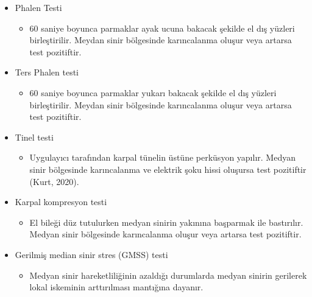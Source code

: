 \documentclass[12pt,twoside]{deuthesis}
\providecommand{\tightlist}{%
  \setlength{\itemsep}{0pt}\setlength{\parskip}{0pt}}
\begin{document}
\begin{itemize}
\item
  Phalen Testi
  \begin{itemize}
  \tightlist
  \item
    60 saniye boyunca parmaklar ayak ucuna bakacak şekilde el dış yüzleri birleştirilir. Meydan sinir bölgesinde karıncalanma oluşur veya artarsa test pozitiftir.
  \end{itemize}
\item
  Ters Phalen testi
  \begin{itemize}
  \tightlist
  \item
    60 saniye boyunca parmaklar yukarı bakacak şekilde el dış yüzleri birleştirilir. Meydan sinir bölgesinde karıncalanma oluşur veya artarsa test pozitiftir.
  \end{itemize}
\item
  Tinel testi
  \begin{itemize}
  \tightlist
  \item
    Uygulayıcı tarafından karpal tünelin üstüne perküsyon yapılır. Medyan sinir bölgesinde karıncalanma ve elektrik şoku hissi oluşursa test pozitiftir (Kurt, 2020).
  \end{itemize}
\item
  Karpal kompresyon testi
  \begin{itemize}
  \tightlist
  \item
    El bileği düz tutulurken medyan sinirin yakınına başparmak ile bastırılır. Medyan sinir bölgesinde karıncalanma oluşur veya artarsa test pozitiftir.
  \end{itemize}
\item
  Gerilmiş median sinir stres (GMSS) testi
  \begin{itemize}
  \tightlist
  \item
    Medyan sinir hareketliliğinin azaldığı durumlarda medyan sinirin gerilerek lokal iskeminin arttırılması mantığına dayanır.
  \end{itemize}
\end{itemize}
\end{document}
